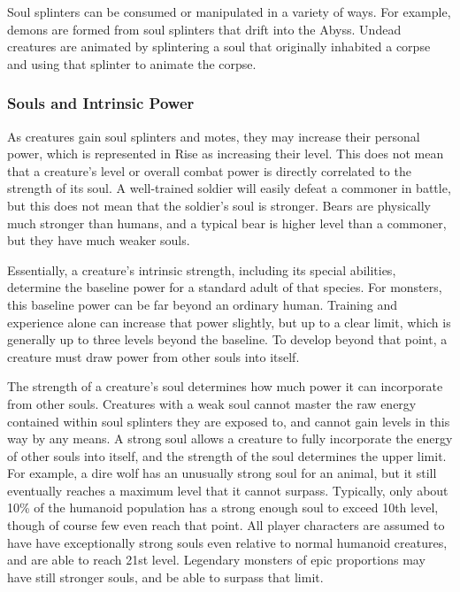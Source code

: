             Soul splinters can be consumed or manipulated in a variety of ways.
            For example, demons are formed from soul splinters that drift into the Abyss.
            Undead creatures are animated by splintering a soul that originally inhabited a corpse and using that splinter to animate the corpse.

        \subsubsection{Souls and Intrinsic Power}
            As creatures gain soul splinters and motes, they may increase their personal power, which is represented in Rise as increasing their level.
            This does not mean that a creature's level or overall combat power is directly correlated to the strength of its soul.
            A well-trained soldier will easily defeat a commoner in battle, but this does not mean that the soldier's soul is stronger.
            Bears are physically much stronger than humans, and a typical bear is higher level than a commoner, but they have much weaker souls.

            Essentially, a creature's intrinsic strength, including its special abilities, determine the baseline power for a standard adult of that species.
            For monsters, this baseline power can be far beyond an ordinary human.
            Training and experience alone can increase that power slightly, but up to a clear limit, which is generally up to three levels beyond the baseline.
            To develop beyond that point, a creature must draw power from other souls into itself.

            The strength of a creature's soul determines how much power it can incorporate from other souls.
            Creatures with a weak soul cannot master the raw energy contained within soul splinters they are exposed to, and cannot gain levels in this way by any means.
            A strong soul allows a creature to fully incorporate the energy of other souls into itself, and the strength of the soul determines the upper limit.
            For example, a dire wolf has an unusually strong soul for an animal, but it still eventually reaches a maximum level that it cannot surpass.
            Typically, only about 10\% of the humanoid population has a strong enough soul to exceed 10th level, though of course few even reach that point.
            All player characters are assumed to have have exceptionally strong souls even relative to normal humanoid creatures, and are able to reach 21st level.
            Legendary monsters of epic proportions may have still stronger souls, and be able to surpass that limit.

